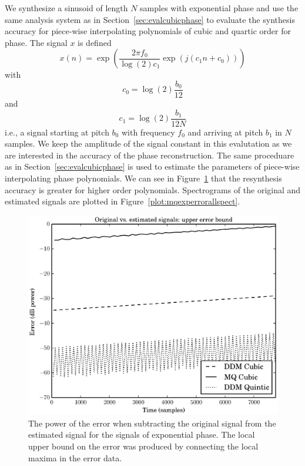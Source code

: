 We synthesize a sinusoid  of length $N$ samples with exponential phase and use
the same analysis system as in Section~\ref{sec:evalcubicphase} to evaluate the
synthesis accuracy for piece-wise interpolating polynomials of cubic and quartic
order for phase. The signal $x$ is defined
\[
    x(n) = \exp(\frac{2\pi f_{0}}{\log(2)c_{1}}\exp(j(c_{1}n + c_{0})))
\]
with
\[
    c_{0} = \log(2)\frac{b_{0}}{12}
\]
and
\[
    c_{1}= \log(2)\frac{b_{1}}{12N}
\]
i.e., a signal starting at pitch $b_{0}$ with frequency $f_{0}$ and arriving at
pitch $b_{1}$ in $N$ samples. We keep the amplitude of the signal constant in
this evalutation as we are interested in the accuracy of the phase
reconstruction. The same proceduare as in
Section~\ref{sec:evalcubicphase} is used to estimate the parameters of
piece-wise interpolating phase polynomials. We can see in
Figure~\ref{plot:mqexperrortruevsesterr} that the resynthesis accuracy is
greater for higher order polynomials. Spectrograms of the original and estimated
signals are plotted in Figure~\ref{plot:mqexperrorallspect}.


\begin{figure}[!t]
    \centering
    \includegraphics[width=\figwidthscale\textwidth]{plots/mq_exp_err_comp_true_vs_est_err.eps}
    \caption{
        The power of the error when subtracting the original signal from the
        estimated signal for the signals of exponential phase. The local upper
        bound on the error was produced by connecting the local maxima in the
        error data.
    \label{plot:mqexperrortruevsesterr}}
\end{figure}

